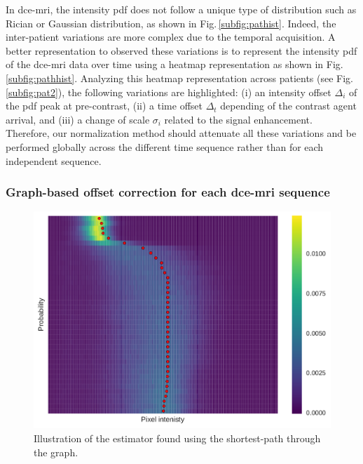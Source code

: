 In \ac{dce}-\ac{mri}, the intensity \ac{pdf} does not follow a unique type of distribution such as Rician or Gaussian distribution, as shown in Fig.\,\ref{subfig:pathist}.
Indeed, the inter-patient variations are more complex due to the temporal acquisition.
A better representation to observed these variations is to represent the intensity \ac{pdf} of the \ac{dce}-\ac{mri} data over time using a heatmap representation as shown in Fig.\,\ref{subfig:pathhist}.
Analyzing this heatmap representation across patients (see Fig.\,\ref{subfig:pat2}), the following variations are highlighted:
(i) an intensity offset $\Delta_i$ of the \ac{pdf} peak at pre-contrast,
(ii) a time offset $\Delta_t$ depending of the contrast agent arrival, and
(iii) a change of scale $\sigma_i$ related to the signal enhancement.
Therefore, our normalization method should attenuate all these variations and be performed globally across the different time sequence rather than for each independent sequence.

\subsubsection{Graph-based offset correction for each \ac{dce}-\ac{mri} sequence}

\begin{figure}
  \centering
  \includegraphics[width=0.7\linewidth]{02_methods/figures/estimator.pdf}
  \caption{Illustration of the estimator found using the shortest-path through the graph.}
  \label{fig:estimator}
\end{figure}

